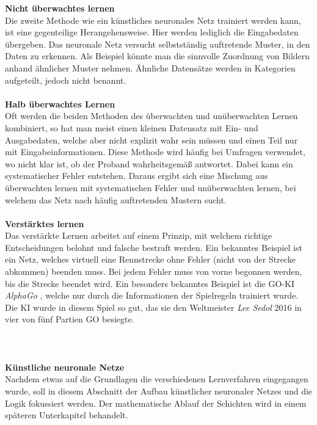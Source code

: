 \documentclass[a4paper,12pt,oneside]{article}
\begin{document}
\textbf{Nicht überwachtes lernen}\\
Die zweite Methode wie ein künstliches neuronales Netz trainiert werden kann, ist eine gegenteilige Herangehensweise. Hier werden lediglich die Eingabedaten übergeben. Das neuronale Netz versucht selbstständig auftretende Muster, in den Daten zu erkennen. Als Beispiel könnte man die sinnvolle Zuordnung von Bildern anhand ähnlicher Muster nehmen. Ähnliche Datensätze werden in Kategorien aufgeteilt, jedoch nicht benannt.\\\\
\textbf{Halb überwachtes Lernen}\\
Oft werden die beiden Methoden des überwachten und unüberwachten Lernen kombiniert, so hat man meist einen kleinen Datensatz mit Ein- und Ausgabedaten, welche aber nicht explizit wahr sein müssen und einen Teil nur mit Eingabeinformationen. Diese Methode wird häufig bei Umfragen verwendet, wo nicht klar ist, ob der Proband wahrheitsgemäß antwortet. Dabei kann ein systematischer Fehler entstehen. Daraus ergibt sich eine Mischung aus überwachten lernen mit systematischen Fehler und unüberwachten lernen, bei welchem das Netz nach häufig auftretenden Mustern sucht.\\\\
\textbf{Verstärktes lernen}\\ 
Das verstärkte Lernen arbeitet auf einem Prinzip, mit welchem richtige Entscheidungen belohnt und falsche bestraft werden. Ein bekanntes Beispiel ist ein Netz, welches virtuell eine Rennstrecke ohne Fehler (nicht von der Strecke abkommen) beenden muss. Bei jedem Fehler muss von vorne begonnen werden, bis die Strecke beendet wird. Ein besonders bekanntes Beispiel ist die GO-KI \textit{AlphaGo} \cite{Alpha2016GO}, welche nur durch die Informationen der Spielregeln trainiert wurde. Die KI wurde in diesem Spiel so gut, das sie den Weltmeister \textit{Lee Sedol} 2016 in vier von fünf Partien GO besiegte.\\\\\\\\
\textbf{Künstliche neuronale Netze}\\
Nachdem etwas auf die Grundlagen die verschiedenen Lernverfahren eingegangen wurde, soll in diesem Abschnitt der Aufbau künstlicher neuronaler Netzes und die Logik fokussiert werden. Der mathematische Ablauf der Schichten wird in einem späteren Unterkapitel behandelt.\\
\end{document}
